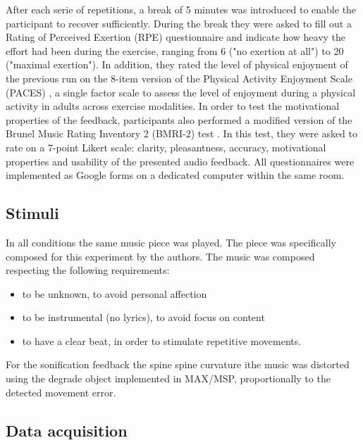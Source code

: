 \documentclass[10pt,letterpaper]{article}
\begin{document}
After each serie of repetitions, a break of 5 minutes was introduced to enable the participant to recover sufficiently. During the break they were asked to fill out a Rating of Perceived Exertion (RPE) questionnaire \cite{borg1998borg} and indicate how heavy the effort had been during the exercise, ranging from 6 ("no exertion at all") to 20 ("maximal exertion"). 
In addition, they rated the level of physical enjoyment of the previous run on the 8-item version of the Physical Activity Enjoyment Scale (PACES) \cite{kendzierski1991physical}, a single factor scale to assess the level of enjoyment during a physical activity in adults across exercise modalities.
In order to test the motivational properties of the feedback, participants also performed a modified version of the Brunel Music Rating Inventory 2 (BMRI-2) test \cite{karageorghis2006redesign}. In this test, they were asked to rate on a 7-point Likert scale: clarity, pleasantness, accuracy, motivational properties and usability of the presented audio feedback. %
All questionnaires were implemented as Google forms on a dedicated computer within the same room.

 

\subsection*{Stimuli}

In all conditions the same music piece was played. The piece was specifically composed for this experiment by the authors. The music was composed respecting the following requirements:
\begin{itemize}
\item to be unknown, to avoid personal affection
\item to be instrumental (no lyrics), to avoid focus on content
\item to have a clear beat, in order to stimulate repetitive movements.
\end{itemize}

For the sonification feedback 
the spine spine curvature
ithe music was distorted using the degrade object implemented in MAX/MSP, proportionally to the detected movement error.

\subsection*{Data acquisition}
\end{document}
